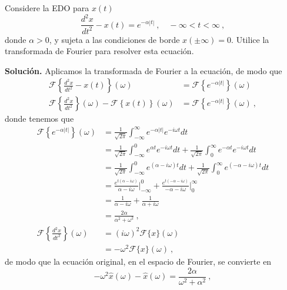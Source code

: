 \begin{ejemplo}
    Considere la EDO para $x(t)$
    \begin{equation}
        \frac{d^2 x}{dt^2} - x(t) = e^{-\alpha |t|} \ , \quad -\infty < t < \infty \ ,
    \end{equation}
    donde $\alpha > 0$, y sujeta a las condiciones de borde $x(\pm \infty) = 0$. Utilice la transformada de Fourier para resolver esta ecuación.
    
    \textbf{Solución.} Aplicamos la transformada de Fourier a la ecuación, de modo que
    \begin{align}
        \mathcal{F}\left\{ \frac{d^2 x}{dt^2} - x(t) \right\}(\omega) & =  \mathcal{F} \left\{ e^{-\alpha |t|} \right\}(\omega) \\
        \mathcal{F} \left\{ \frac{d^2x}{dt^2} \right\}(\omega) - \mathcal{F} \left\{ x(t) \right\}(\omega)  & = \mathcal{F} \left\{ e^{-\alpha |t|} \right\}(\omega) \ ,
    \end{align}
    donde tenemos que
    \begin{align}
        \mathcal{F} \left\{ e^{-\alpha |t|} \right\}(\omega) & = \frac{1}{\sqrt{2\pi}} \int_{-\infty}^\infty e^{-\alpha |t|} e^{-i\omega t} dt \nonumber \\
        & = \frac{1}{\sqrt{2\pi}} \int_{-\infty}^0 e^{\alpha t} e^{-i\omega t} dt + \frac{1}{\sqrt{2\pi}} \int_0^\infty e^{-\alpha t} e^{-i\omega t} dt \nonumber \\
        & = \frac{1}{\sqrt{2\pi}} \int_{-\infty}^0 e^{(\alpha -i\omega) t} dt + \frac{1}{\sqrt{2\pi}} \int_0^\infty e^{(-\alpha -i\omega) t} dt \nonumber \\
        & = \frac{e^{t(\alpha - i \omega)}}{\alpha - i\omega} \left.\right|_{-\infty}^0 + \frac{e^{t(-\alpha - i \omega)}}{-\alpha - i\omega} \left.\right|_0^{\infty} \nonumber \\
        & = \frac{1}{\alpha - i\omega} + \frac{1}{\alpha + i\omega} \nonumber \\
        & = \frac{2\alpha}{\alpha^2 + \omega^2} \ , \\
        \mathcal{F} \left\{ \frac{d^2x}{dt^2} \right\}(\omega) & = (i\omega)^2 \mathcal{F}\{ x \}(\omega) \nonumber \\
        & = -\omega^2 \mathcal{F}\{ x \}(\omega) \ ,
    \end{align}
    de modo que la ecuación original, en el espacio de Fourier, se convierte en
    \begin{equation}
        -\omega^2 \hat{x}(\omega) - \hat{x}(\omega) = \frac{2\alpha}{\omega^2 + \alpha^2} \ ,

\end{equation}
\end{ejemplo}

